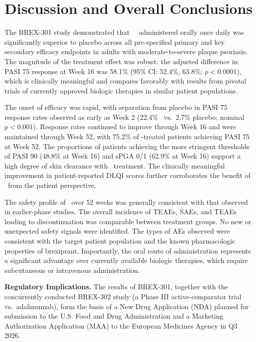 \section{Discussion and Overall Conclusions}

The BREX-301 study demonstrated that \studydrug\ \studydose\ administered orally once daily was significantly superior to placebo across all pre-specified primary and key secondary efficacy endpoints in adults with moderate-to-severe plaque psoriasis. The magnitude of the treatment effect was robust: the adjusted difference in PASI 75 response at Week 16 was 58.1\% (95\% CI: 52.4\%, 63.8\%; $p < 0.0001$), which is clinically meaningful and compares favorably with results from pivotal trials of currently approved biologic therapies in similar patient populations.

\vspace{4pt}
The onset of efficacy was rapid, with separation from placebo in PASI 75 response rates observed as early as Week 2 (22.4\% \studydrug\ vs.\ 2.7\% placebo; nominal $p < 0.001$). Response rates continued to improve through Week 16 and were maintained through Week 52, with 75.2\% of \studydrug-treated patients achieving PASI 75 at Week 52. The proportions of patients achieving the more stringent thresholds of PASI 90 (48.8\% at Week 16) and sPGA 0/1 (62.9\% at Week 16) support a high degree of skin clearance with \studydrug\ treatment. The clinically meaningful improvement in patient-reported DLQI scores further corroborates the benefit of \studydrug\ from the patient perspective.

\vspace{4pt}
The safety profile of \studydrug\ over 52 weeks was generally consistent with that observed in earlier-phase studies. The overall incidence of TEAEs, SAEs, and TEAEs leading to discontinuation was comparable between treatment groups. No new or unexpected safety signals were identified. The types of AEs observed were consistent with the target patient population and the known pharmacologic properties of brexiprant. Importantly, the oral route of administration represents a significant advantage over currently available biologic therapies, which require subcutaneous or intravenous administration.

\begin{notebox}
\textbf{Regulatory Implications.} The results of BREX-301, together with the concurrently conducted BREX-302 study (a Phase III active-comparator trial vs.\ adalimumab), form the basis of a New Drug Application (NDA) planned for submission to the U.S. Food and Drug Administration and a Marketing Authorization Application (MAA) to the European Medicines Agency in Q3 2026.
\end{notebox}

